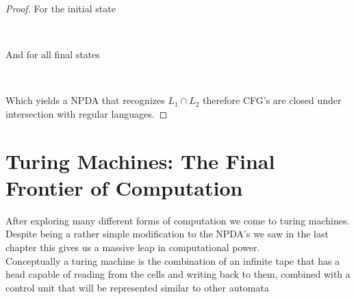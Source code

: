 \documentclass[11pt]{exam}
\begin{document}
\begin{proof}
For the initial state
\begin{center}
\\
\end{center}

And for all final states
\begin{center}
\\
\end{center}

Which yields a NPDA that recognizes $L_1 \cap L_2$ therefore CFG's are closed under intersection with regular languages.
\end{proof}

\newpage

\section{Turing Machines: The Final Frontier of Computation}
After exploring many different forms of computation we come to turing machines. Despite being a rather simple modification to the NPDA's we saw in the last chapter this gives us a massive leap in computational power.\\

Conceptually a turing machine is the combination of an infinite tape that has a head capable of reading from the cells and writing back to them, combined with a control unit that will be represented similar to other automata\\
\end{document}
